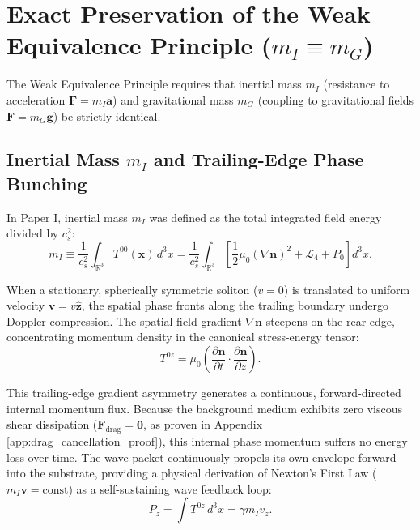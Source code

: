 \documentclass[11pt,a4paper]{article}
\begin{document}
	\section{Exact Preservation of the Weak Equivalence Principle ($m_I \equiv m_G$)}
	\label{sec:equivalence_principle}
	
	The Weak Equivalence Principle requires that inertial mass $m_I$ (resistance to acceleration $\mathbf{F} = m_I \mathbf{a}$) and gravitational mass $m_G$ (coupling to gravitational fields $\mathbf{F} = m_G \mathbf{g}$) be strictly identical.
	
	\subsection{Inertial Mass $m_I$ and Trailing-Edge Phase Bunching}
	\label{sec:inertial_mass_phase_bunching}
	
	In Paper I, inertial mass $m_I$ was defined as the total integrated field energy divided by $c_s^2$:
	\begin{equation}
		m_I \equiv \frac{1}{c_s^2} \int_{\mathbb{R}^3} T^{00}(\mathbf{x}) \, d^3x = \frac{1}{c_s^2} \int_{\mathbb{R}^3} \left[ \frac{1}{2}\mu_0 (\nabla \mathbf{n})^2 + \mathcal{L}_4 + P_0 \right] d^3x.
		\label{eq:inertial_mass_def}
	\end{equation}
	
	When a stationary, spherically symmetric soliton ($v = 0$) is translated to uniform velocity $\mathbf{v} = v \hat{\mathbf{z}}$, the spatial phase fronts along the trailing boundary undergo Doppler compression. The spatial field gradient $\nabla \mathbf{n}$ steepens on the rear edge, concentrating momentum density in the canonical stress-energy tensor:
	\begin{equation}
		T^{0z} = \mu_0 \left( \frac{\partial \mathbf{n}}{\partial t} \cdot \frac{\partial \mathbf{n}}{\partial z} \right).
		\label{eq:momentum_density_tensor}
	\end{equation}
	
	This trailing-edge gradient asymmetry generates a continuous, forward-directed internal momentum flux. Because the background medium exhibits zero viscous shear dissipation ($\mathbf{F}_{\text{drag}} = \mathbf{0}$, as proven in Appendix \ref{app:drag_cancellation_proof}), this internal phase momentum suffers no energy loss over time. The wave packet continuously propels its own envelope forward into the substrate, providing a physical derivation of Newton's First Law ($m_I \mathbf{v} = \text{const}$) as a self-sustaining wave feedback loop:
	\begin{equation}
		P_z = \int T^{0z} \, d^3x = \gamma m_I v_z.
		\label{eq:integrated_inertial_momentum}
	\end{equation}
	
\end{document}

